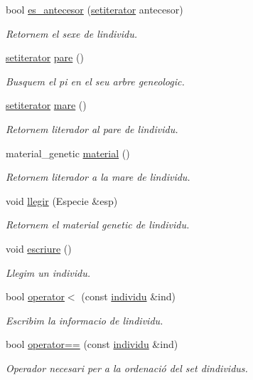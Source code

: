 \begin{DoxyCompactItemize}
bool \hyperlink{classindividu_a633ae30a6f1f1f7b36b04484cb346b13}{es\+\_\+antecesor} (\hyperlink{main_8cc_a54fb6ab8ec9e9336d208b860dca1513d}{setiterator} antecesor)
\begin{DoxyCompactList}\small\item\em Retornem el sexe de l\textquotesingle{}individu. \end{DoxyCompactList}\item 
\hyperlink{main_8cc_a54fb6ab8ec9e9336d208b860dca1513d}{setiterator} \hyperlink{classindividu_a6f379a03c06d9c39c47b20fa4b1a899b}{pare} ()
\begin{DoxyCompactList}\small\item\em Busquem el pi en el seu arbre geneologic. \end{DoxyCompactList}\item 
\hyperlink{main_8cc_a54fb6ab8ec9e9336d208b860dca1513d}{setiterator} \hyperlink{classindividu_a8f1a09977b42f186fae0955ce7ef683e}{mare} ()
\begin{DoxyCompactList}\small\item\em Retornem l\textquotesingle{}iterador al pare de l\textquotesingle{}individu. \end{DoxyCompactList}\item 
material\+\_\+genetic \hyperlink{classindividu_a89c30a9e1a39e5860f4c9cd421b033d7}{material} ()
\begin{DoxyCompactList}\small\item\em Retornem l\textquotesingle{}iterador a la mare de l\textquotesingle{}individu. \end{DoxyCompactList}\item 
void \hyperlink{classindividu_a309eb865a39352302fd8d97cf67584bb}{llegir} (Especie \&esp)
\begin{DoxyCompactList}\small\item\em Retornem el material genetic de l\textquotesingle{}individu. \end{DoxyCompactList}\item 
void \hyperlink{classindividu_a88659e52840409422fc354b513ca03a8}{escriure} ()
\begin{DoxyCompactList}\small\item\em Llegim un individu. \end{DoxyCompactList}\item 
bool \hyperlink{classindividu_a7114f10c0a85509c7147efd452332df9}{operator$<$} (const \hyperlink{classindividu}{individu} \&ind)
\begin{DoxyCompactList}\small\item\em Escribim la informacio de l\textquotesingle{}individu. \end{DoxyCompactList}\item 
bool \hyperlink{classindividu_a312a6d92427bfa23cd04d7422d5dd98b}{operator==} (const \hyperlink{classindividu}{individu} \&ind)
\begin{DoxyCompactList}\small\item\em Operador necesari per a la ordenació del set d\textquotesingle{}individus. \end{DoxyCompactList}\end{DoxyCompactItemize}


